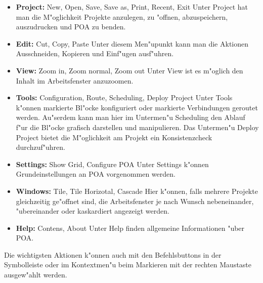 \documentclass[a4paper,titlepage,12pt,ngerman]{scrbook}
\begin{document}
\begin{itemize}
\item {\bf Project:}	New, Open, Save, Save as, Print, Recent, Exit\newline
Unter Project hat man die M"oglichkeit Projekte anzulegen, zu "offnen, abzuspeichern, auszudrucken und POA zu benden.
\item {\bf Edit:}	Cut, Copy, Paste\newline
Unter diesem Men"upunkt kann man die Aktionen Ausschneiden, Kopieren und Einf"ugen ausf"uhren.
\item {\bf View:}	Zoom in, Zoom normal, Zoom out\newline
Unter View ist es m"oglich den Inhalt im Arbeitsfenster anzuzoomen.
\item {\bf Tools:} 	Configuration, Route, Scheduling, Deploy Project\newline
Unter Tools k"onnen markierte Bl"ocke konfiguriert oder markierte Verbindungen geroutet werden. Au"serdem kann man hier im Untermen"u Scheduling den Ablauf f"ur die Bl"ocke grafisch darstellen und manipulieren. Das Untermen"u Deploy Project bietet die M"oglichkeit am Projekt ein Konsistenzcheck durchzuf"uhren.
\item {\bf Settings:}	Show Grid, Configure POA\newline
Unter Settings k"onnen Grundeinstellungen an POA vorgenommen werden.
\item {\bf Windows:} 	Tile, Tile Horizotal, Cascade\newline
Hier k"onnen, falls mehrere Projekte gleichzeitig ge"offnet sind, die Arbeitsfenster je nach Wunsch nebeneinander, "ubereinander oder kaskardiert angezeigt werden.
\item {\bf Help:} 	Contens, About\newline
Unter Help finden allgemeine Informationen "uber POA.\par
\end{itemize}

Die wichtigsten Aktionen k"onnen auch mit den Befehlsbuttons in der Symbolleiste oder im Kontextmen"u beim Markieren mit der rechten Maustaste ausgew"ahlt werden.
\end{document}
